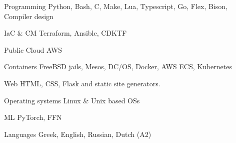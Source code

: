 


\begin{cvskills}


\cvskill
{Programming} %
{Python, Bash, C, Make, Lua, Typescript, Go, Flex, Bison, Compiler design} %


\cvskill
		{IaC \& CM} %
{Terraform, Ansible, CDKTF} %


\cvskill
{Public Cloud} %
{AWS} %


\cvskill
{Containers} %
{FreeBSD jails, Mesos, DC/OS, Docker, AWS ECS, Kubernetes} %


\cvskill
{Web} %
{HTML, CSS, Flask and static site generators.} %


\cvskill
{Operating systems} %
{Linux \& Unix based OSs} %




\cvskill
{ML} %
{PyTorch, FFN } %


\cvskill
{Languages} %
{Greek, English, Russian, Dutch (A2)} %

\end{cvskills}
